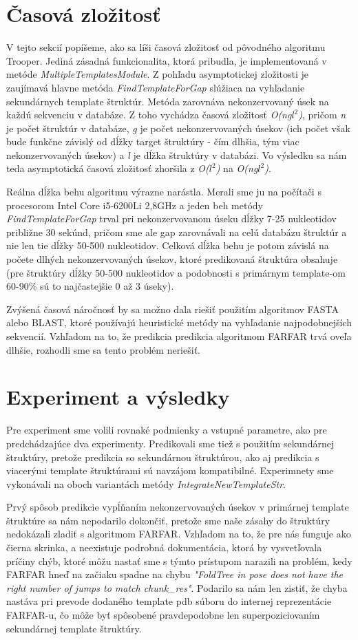 \section{Časová zložitosť} 
V tejto sekcií popíšeme, ako sa líši časová zložitosť od pôvodného algoritmu Trooper. Jediná zásadná funkcionalita, ktorá pribudla, je implementovaná v metóde \textit{MultipleTemplatesModule}.
Z pohľadu asymptotickej zložitosti je zaujímavá hlavne metóda  \textit{FindTemplateForGap} slúžiaca na vyhľadanie sekundárnych template štruktúr. Metóda zarovnáva nekonzervovaný úsek na každú sekvenciu v databáze. Z toho vychádza časová zložitosť \textit{O(ng$l^2$)}, pričom \textit{n} je počet štruktúr v databáze, \textit{g} je počet nekonzervovaných úsekov (ich počet však bude funkčne závislý od dĺžky target štruktúry - čím dlhšia, tým viac nekonzervovaných úsekov)  a \textit{l} je dĺžka štruktúry v databázi. Vo výsledku sa nám teda asymptotická časová zložitosť zhoršila z \textit{O($l^2$)} na \textit{O(ng$l^2$)}.


\indent Reálna dĺžka behu algoritmu výrazne narástla. Merali sme ju na počítači s procesorom Intel Core i5-6200Li 2,8GHz a jeden beh metódy \textit{FindTemplateForGap} trval pri nekonzervovanom úseku dĺžky 7-25 nukleotidov približne 30 sekúnd, pričom sme ale gap zarovnávali na celú databázu štruktúr a nie len tie dĺžky 50-500 nukleotidov. Celková dĺžka behu je potom závislá na počete dlhých nekonzervovaných úsekov, ktoré predikovaná štruktúra obsahuje (pre štruktúry dĺžky 50-500 nukleotidov a podobnosti s primárnym template-om 60-90\% sú to  najčastejšie 0 až 3 úseky). 


\indent Zvýšená časová náročnosť by sa možno dala riešiť použitím algoritmov FASTA alebo BLAST, ktoré používajú heuristické metódy na vyhľadanie najpodobnejších sekvencií. Vzhľadom na to, že predikcia predikcia algoritmom FARFAR trvá oveľa dlhšie, rozhodli sme sa tento problém neriešiť.


\section{Experiment a výsledky} 
Pre experiment sme volili rovnaké podmienky a vstupné parametre, ako pre predchádzajúce dva experimenty. Predikovali sme tiež s použitím sekundárnej štruktúry, pretože predikcia so sekundárnou štruktúrou, ako aj predikcia s viacerými template štruktúrami sú navzájom kompatibilné. Experimnety sme vykonávali na oboch variantách metódy \textit{IntegrateNewTemplateStr}.


\indent Prvý spôsob predikcie vypĺňaním nekonzervovaných úsekov v primárnej template štruktúre sa nám nepodarilo dokončiť, pretože sme naše zásahy do štruktúry nedokázali zladiť s algoritmom FARFAR. Vzhľadom na to, že pre nás funguje ako čierna skrinka, a neexistuje podrobná dokumentácia, ktorá by vysvetľovala príčiny chýb, ktoré môžu nastať sme s týmto prístupom narazili na problém, kedy FARFAR hneď na začiaku spadne na chybu \textit{"FoldTree in pose does not have the right number of jumps to match chunk\_res"}. Podarilo sa nám len zistiť, že chyba nastáva pri prevode dodaného template pdb súboru do internej reprezentácie FARFAR-u, čo môže byť spôsobené pravdepodobne len superpoziciovaním sekundárnej template štruktúry.


